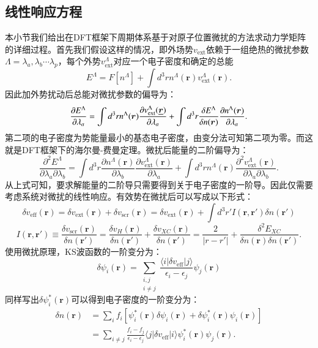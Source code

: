 \subsection{线性响应方程}
本小节我们给出在DFT框架下周期体系基于对原子位置微扰的方法求动力学矩阵的详细过程。首先我们假设这样的情况，即外场势$v_{\mathrm{ext}}$依赖于一组绝热的微扰参数$\Lambda={\lambda_a,\lambda_b \cdots \lambda_p}$，每个外势$v_{\mathrm{ext}}^\Lambda$对应一个电子密度和确定的总能
\begin{equation}
  E^\Lambda = F[n^\Lambda]+\int d^3 r n^\Lambda (\bm{r})v_\mathrm{ext}^\Lambda (\bm{r}).
\end{equation}
因此加外势扰动后总能对微扰参数的偏导为：
\begin{equation}
  \frac{\partial E^\Lambda}{\partial \lambda_a} =
  \int d^3 r n^\Lambda(\bm{r})\frac{\partial v^\Lambda_\mathrm{ext}(\underline{\bm{r}})}{\partial \lambda_a} +
  \int d^3 r \frac{\delta E^\Lambda}{\delta n(\bm{r})} \frac{\partial n^\Lambda(\bm{r})}{\partial \lambda_a}.
\end{equation}
第二项的电子密度为势能量最小的基态电子密度，由变分法可知第二项为零。而这就是DFT框架下的海尔曼-费曼定理\cite{feynman1939forces}。微扰后能量的二阶偏导为：
\begin{equation}\label{eq:second_order_energy}
  \frac{\partial^2 E^\Lambda}{\partial\lambda_a\partial\lambda_b} =
  \int d^3 r\frac{\partial n^\Lambda(\bm{r})}{\partial\lambda_b}\frac{\partial v^\Lambda_\mathrm{ext}(\bm{r})}{\partial\lambda_a} +
  \int d^3 r n^\Lambda(\bm{r})\frac{\partial^2 v^\Lambda_\mathrm{ext}(\bm{r})}{\partial\lambda_a\partial\lambda_b}.
\end{equation}
从上式可知，要求解能量的二阶导只需要得到关于电子密度的一阶导。因此仅需要考虑系统对微扰的线性响应。有效势在微扰后可以写成以下形式：
\begin{equation}\label{eq:linear_variation}
  \delta v_{\mathrm{eff}}(\bm{r}) = \delta v_\mathrm{ext}(\bm{r}) + \delta v_\mathrm{scr}(\bm{r}) =
  \delta v_\mathrm{ext}(\bm{r}) + \int d^3 r' I(\bm{r},\bm{r'})\delta n(\bm{r'})
\end{equation}
\begin{equation}
  I(\bm{r},\bm{r'}) \equiv \frac{\delta v_\mathrm{scr}(\bm{r})}{\delta n(\bm{r'})} = \frac{\delta v_H(\bm{r})}{\delta n(\bm{r'})} +
  \frac{\delta v_{XC}(\bm{r})}{\delta n(\bm{r'})} =
  \frac{2}{|r-r'|} + \frac{\delta^2 E_{XC}}{\delta n(\bm{r}) \delta n(\bm{r'})}.
\end{equation}
使用微扰原理，KS波函数的一阶变分为：
\begin{equation}
  \delta \psi_i(\bm{r}) = \sum_{\substack{i,j\\i\neq j}} \frac{\langle i |\delta v_{\mathrm{eff}}|j \rangle}{\epsilon_i-\epsilon_j} \psi_j(\bm{r})
\end{equation}
同样写出$\delta \psi_i^*(\bm{r})$可以得到电子密度的一阶变分为：
\begin{align}\label{eq:linear_variation_ele}
  \delta n(\bm{r}) &= \sum_i f_i [\psi_i^*(\bm{r})\delta \psi_i(\bm{r}) + \delta \psi_i^*(\bm{r}) \psi_i(\bm{r})] \\
  &= \sum_{i\neq j} \frac{f_i-f_j}{\epsilon_i-\epsilon_j} \langle j| \delta v_\mathrm{eff} | i \rangle \psi_i^*(\bm{r}) \psi_j(\bm{r}).
\end{align}

